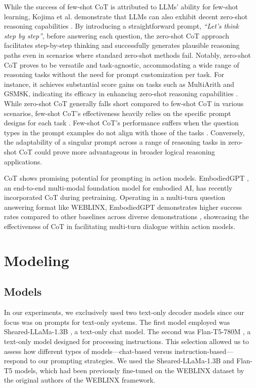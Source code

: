\documentclass[11pt]{article}
\begin{document}
While the success of few-shot CoT is attributed to LLMs’ ability for few-shot learning, Kojima et al. demonstrate that LLMs can also exhibit decent zero-shot reasoning capabilities \cite{Large_Language_Models_Zero_Shot_Reasoners}. By introducing a straightforward prompt, \textit{“Let’s think step by step”}, before answering each question, the zero-shot CoT approach facilitates step-by-step thinking and successfully generates plausible reasoning paths even in scenarios where standard zero-shot methods fail. Notably, zero-shot CoT proves to be versatile and task-agnostic, accommodating a wide range of reasoning tasks without the need for prompt customization per task. For instance, it achieves substantial score gains on tasks such as MultiArith and GSM8K, indicating its efficacy in enhancing zero-shot reasoning capabilities \cite{Large_Language_Models_Zero_Shot_Reasoners}. While zero-shot CoT generally falls short compared to few-shot CoT in various scenarios, few-shot CoT's effectiveness heavily relies on the specific prompt designs for each task \cite{Large_Language_Models_Zero_Shot_Reasoners}. Few-shot CoT’s performance suffers when the question types in the prompt examples do not align with those of the tasks \cite{Large_Language_Models_Zero_Shot_Reasoners}. Conversely, the adaptability of a singular prompt across a range of reasoning tasks in zero-shot CoT could prove more advantageous in broader logical reasoning applications.

CoT shows promising potential for prompting in action models. EmbodiedGPT \cite{mu_2023_embodied_gpt}, an end-to-end multi-modal foundation model for embodied AI, has recently incorporated CoT during pretraining. Operating in a multi-turn question answering format like WEBLINX, EmbodiedGPT demonstrates higher success rates compared to other baselines across diverse demonstrations \cite{mu_2023_embodied_gpt}, showcasing the effectiveness of CoT in facilitating multi-turn dialogue within action models.

\section{Modeling} \label{sec:Modeling}

\subsection{Models}
In our experiments, we exclusively used two text-only decoder models since our focus was on prompts for text-only systems. The first model employed was Sheared-LLaMa-1.3B \cite{xia_2023_sheared_llama}, a text-only chat model. The second was Flan-T5-780M \cite{flant5}, a text-only model designed for processing instructions. This selection allowed us to assess how different types of models—chat-based versus instruction-based—respond to our prompting strategies. We used the Sheared-LLaMa-1.3B and Flan-T5 models, which had been previously fine-tuned on the WEBLINX dataset by the original authors of the WEBLINX framework.
\end{document}
